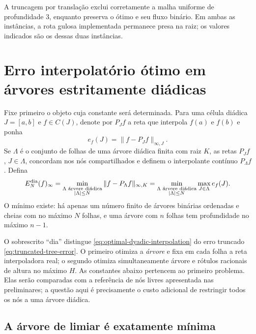 \documentclass[11pt,a4paper]{article}
\theoremstyle{definition}
\theoremstyle{remark}
\begin{document}
A truncagem por translação exclui corretamente a malha uniforme de
profundidade $3$, enquanto preserva o ótimo e seu fluxo binário. Em ambas as
instâncias, a rota gulosa implementada permanece presa na raiz; os valores indicados são os dessas duas instâncias.

\section{Erro interpolatório ótimo em árvores estritamente diádicas}
\label{sec:dyadic-asymptotic}

Fixe primeiro o objeto cuja constante será determinada. Para uma célula
diádica $J=[a,b]$ e $f\in C(J)$, denote por $P_Jf$ a reta que interpola
$f(a)$ e $f(b)$ e ponha
\begin{equation}
 e_f(J)=\|f-P_Jf\|_{\infty,J}.
 \label{eq:local-interpolation-error}
\end{equation}
Se $\Lambda$ é o conjunto de folhas de uma árvore diádica finita com raiz
$K$, as retas $P_Jf$, $J\in\Lambda$, concordam nos nós compartilhados e
definem o interpolante contínuo $P_\Lambda f$. Defina
\begin{equation}
 E_N^{\rm dia}(f)_\infty
 =\min_{\substack{\Lambda\text{ árvore diádica}\\ |\Lambda|\le N}}
   \|f-P_\Lambda f\|_{\infty,K}
 =\min_{\substack{\Lambda\text{ árvore diádica}\\ |\Lambda|\le N}}
   \max_{J\in\Lambda}e_f(J).
 \label{eq:optimal-dyadic-interpolation}
\end{equation}
O mínimo existe: há apenas um número finito de árvores binárias ordenadas e
cheias com no máximo $N$ folhas, e uma árvore com $n$ folhas tem profundidade
no máximo $n-1$.

O sobrescrito ``dia'' distingue \eqref{eq:optimal-dyadic-interpolation} do
erro truncado \eqref{eq:truncated-tree-error}. O primeiro otimiza a
\emph{árvore} e fixa em cada folha a reta interpoladora real; o segundo
otimiza simultaneamente árvore e rótulos racionais de altura no máximo $H$.
As constantes abaixo pertencem ao primeiro problema.
Elas serão comparadas com a referência de nós livres apresentada nas preliminares; a questão aqui é precisamente o custo adicional de
restringir todos os nós a uma árvore diádica.

\subsection{A árvore de limiar é exatamente mínima}
\end{document}
